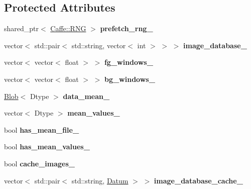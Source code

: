 \subsection*{Protected Attributes}
\begin{DoxyCompactItemize}
\item 
\mbox{\label{classcaffe_1_1_window_data_layer_aa9d3942a483d8264bd37cf35ac9c0182}} 
shared\+\_\+ptr$<$ \mbox{\hyperlink{classcaffe_1_1_caffe_1_1_r_n_g}{Caffe\+::\+R\+NG}} $>$ {\bfseries prefetch\+\_\+rng\+\_\+}
\item 
\mbox{\label{classcaffe_1_1_window_data_layer_acc13c80083e4c0f1c5c84c57e65b872a}} 
vector$<$ std\+::pair$<$ std\+::string, vector$<$ int $>$ $>$ $>$ {\bfseries image\+\_\+database\+\_\+}
\item 
\mbox{\label{classcaffe_1_1_window_data_layer_a4ac44cf988fa29dafc83b36e3139b088}} 
vector$<$ vector$<$ float $>$ $>$ {\bfseries fg\+\_\+windows\+\_\+}
\item 
\mbox{\label{classcaffe_1_1_window_data_layer_abc135d939cdb4aa5aae87b760b721084}} 
vector$<$ vector$<$ float $>$ $>$ {\bfseries bg\+\_\+windows\+\_\+}
\item 
\mbox{\label{classcaffe_1_1_window_data_layer_a1ffb19d64d1c922b95f341db65fd04e0}} 
\mbox{\hyperlink{classcaffe_1_1_blob}{Blob}}$<$ Dtype $>$ {\bfseries data\+\_\+mean\+\_\+}
\item 
\mbox{\label{classcaffe_1_1_window_data_layer_a01f6682e38889ed8ffc3e59b816edaa4}} 
vector$<$ Dtype $>$ {\bfseries mean\+\_\+values\+\_\+}
\item 
\mbox{\label{classcaffe_1_1_window_data_layer_a9a7d659a86e8edefc559dd5583403c83}} 
bool {\bfseries has\+\_\+mean\+\_\+file\+\_\+}
\item 
\mbox{\label{classcaffe_1_1_window_data_layer_a20f111cf16f037ce270d69c0601ee17f}} 
bool {\bfseries has\+\_\+mean\+\_\+values\+\_\+}
\item 
\mbox{\label{classcaffe_1_1_window_data_layer_a35b00ee7875f50e06b46bf4c47ee8513}} 
bool {\bfseries cache\+\_\+images\+\_\+}
\item 
\mbox{\label{classcaffe_1_1_window_data_layer_aa9c4a5c598ee365e8e836fe34acb7e00}} 
vector$<$ std\+::pair$<$ std\+::string, \mbox{\hyperlink{classcaffe_1_1_datum}{Datum}} $>$ $>$ {\bfseries image\+\_\+database\+\_\+cache\+\_\+}
\end{DoxyCompactItemize}


